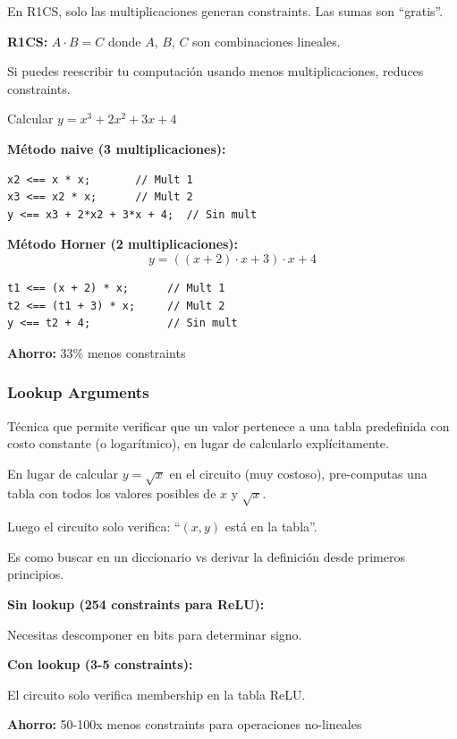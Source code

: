 \documentclass[11pt,a4paper,twoside]{book}
\begin{document}
\begin{keyidea}
En R1CS, solo las multiplicaciones generan constraints. Las sumas son ``gratis''.

\textbf{R1CS:} $A \cdot B = C$ donde $A$, $B$, $C$ son combinaciones lineales.

Si puedes reescribir tu computaci\'on usando menos multiplicaciones, reduces constraints.
\end{keyidea}

\begin{example}
Calcular $y = x^3 + 2x^2 + 3x + 4$

\textbf{M\'etodo naive (3 multiplicaciones):}
\begin{verbatim}
x2 <== x * x;       // Mult 1
x3 <== x2 * x;      // Mult 2
y <== x3 + 2*x2 + 3*x + 4;  // Sin mult
\end{verbatim}

\textbf{M\'etodo Horner (2 multiplicaciones):}
\[
y = ((x + 2) \cdot x + 3) \cdot x + 4
\]
\begin{verbatim}
t1 <== (x + 2) * x;      // Mult 1
t2 <== (t1 + 3) * x;     // Mult 2
y <== t2 + 4;            // Sin mult
\end{verbatim}

\textbf{Ahorro:} 33\% menos constraints
\end{example}

\subsubsection{Lookup Arguments}

\begin{definition}
T\'ecnica que permite verificar que un valor pertenece a una tabla predefinida con costo constante (o logar\'itmico), en lugar de calcularlo expl\'icitamente.
\end{definition}

\begin{intuicion}
En lugar de calcular $y = \sqrt{x}$ en el circuito (muy costoso), pre-computas una tabla con todos los valores posibles de $x$ y $\sqrt{x}$.

Luego el circuito solo verifica: ``$(x, y)$ est\'a en la tabla''.

Es como buscar en un diccionario vs derivar la definici\'on desde primeros principios.
\end{intuicion}

\begin{example}
\textbf{Sin lookup (254 constraints para ReLU):}

Necesitas descomponer en bits para determinar signo.

\textbf{Con lookup (3-5 constraints):}

El circuito solo verifica membership en la tabla ReLU.

\textbf{Ahorro:} 50-100x menos constraints para operaciones no-lineales
\end{example}
\end{document}
